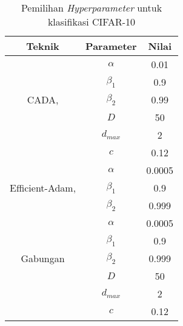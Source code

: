 \begin{table}[H]
  \caption{Pemilihan \emph{Hyperparameter} untuk klasifikasi CIFAR-10}\label{hyperparamresnet}
  \centering
  \begin{tabular}{ | c | c | c | }
    \hline
    \textbf{Teknik}                                               & \textbf{Parameter} & \textbf{Nilai} \\
    \hline
    \multirow{5}{*}{CADA, \textcite{Chen2021CADA}}                & $\alpha$           & 0.01           \\
                                                                  & $\beta_1$          & 0.9            \\
                                                                  & $\beta_2$          & 0.99           \\
                                                                  & $D$                & 50             \\
                                                                  & $d_{max}$          & 2              \\
                                                                  & $c$                & 0.12           \\
    \hline
    \multirow{3}{*}{Efficient-Adam, \textcite{Chen2022Efficient}} & $\alpha$           & 0.0005         \\
                                                                  & $\beta_1$          & 0.9            \\
                                                                  & $\beta_2$          & 0.999          \\
    \hline
    \multirow{5}{*}{Gabungan}                                     & $\alpha$           & 0.0005         \\
                                                                  & $\beta_1$          & 0.9            \\
                                                                  & $\beta_2$          & 0.999          \\
                                                                  & $D$                & 50             \\
                                                                  & $d_{max}$          & 2              \\
                                                                  & $c$                & 0.12           \\
    \hline
  \end{tabular}
\end{table}

